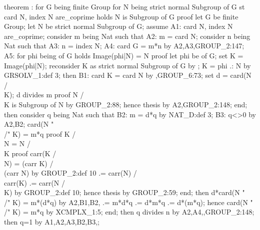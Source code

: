 \nwenddocs{}\endmoddef\nwstartdeflinemarkup{}\nwenddeflinemarkup
theorem :
  for G being finite Group
  for N being strict normal Subgroup of G
  st card N, index N are_coprime
  holds N is  Subgroup of G
proof
  let G be finite Group;
  let N be strict normal Subgroup of G;
  assume A1: card N, index N are_coprime;
  consider m being Nat such that
  A2: m = card N;
  consider n being Nat such that
  A3: n = index N;
  A4: card G = m*n by A2,A3,GROUP_2:147;
  A5: for phi being  of G holds Image(phi|N) = N
  proof
    let phi be  of G;
    set K = Image(phi|N);
    reconsider K as strict normal Subgroup of G by ;
    K = phi .: N by GRSOLV_1:def 3;
    then B1: card K = card N by ,GROUP_6:73;
    set d = card(N /\\ K);
    d divides m
    proof
      N /\\ K is Subgroup of N by GROUP_2:88;
      hence thesis by A2,GROUP_2:148;
    end;
    then consider q being Nat such that
    B2: m = d*q by NAT_D:def 3;
    B3: q<>0 by A2,B2;
    card(N "\\/" K) = m*q
    proof
      K /\\ N = N /\\ K
      proof
        carr(K /\\ N) = (carr K) /\\ (carr N) by GROUP_2:def 10
                    .= carr(N) /\\ carr(K)
                    .= carr(N /\\ K) by GROUP_2:def 10;
        hence thesis by GROUP_2:59;
      end;
      then d*card(N "\\/" K) = m*(d*q) by A2,B1,B2,
                           .= m*d*q
                           .= d*m*q
                           .= d*(m*q);
      hence card(N "\\/" K) = m*q by XCMPLX_1:5;
    end;
    then q divides n by A2,A4,,GROUP_2:148;
    then q=1 by A1,A2,A3,B2,B3,;
